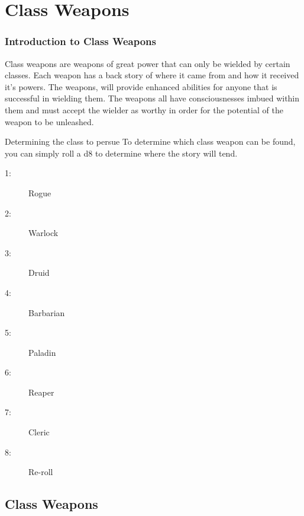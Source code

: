 \chapter{Class Weapons} \label{Weapons}

\subsection{Introduction to Class Weapons}

Class weapons are weapons of great power that can only be wielded by certain classes. Each weapon has a back story of where it came from and how it received it's powers. The weapons, will provide enhanced abilities for anyone that is successful in wielding them. The weapons all have consciousnesses imbued within them and must accept the wielder as worthy in order for the potential of the weapon to be unleashed. 

\begin{commentbox}{Determining the class to persue}
	To determine which class weapon can be found, you can simply roll a d8 to determine where the story will tend.
	\hline
	\begin{multicols}{4}
		\begin{description}
			\item[1:] Rogue 
			\item[2:] Warlock
			\item[3:] Druid
			\item[4:] Barbarian
			\item[5:] Paladin
			\item[6:] Reaper
			\item[7:] Cleric
			\item[8:] Re-roll
		\end{description}
	\end{multicols}
\end{commentbox}

\section{Class Weapons}















%

